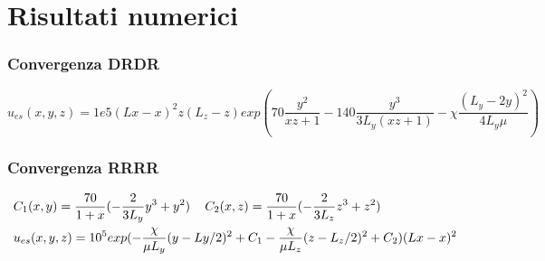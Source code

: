 \section{Risultati numerici}
\begin{frame}
\tableofcontents[currentsection]
\end{frame}

\begin{frame}
\frametitle{Convergenza DRDR}
\begin{alertblock}{}
\vspace{-0.3cm}
{\footnotesize
\begin{equation}
u_{es}(x,y,z)=1e5(Lx - x)^2z(L_z-z)exp\left(70\frac{y^2}{xz + 1} - 140\frac{y^3}{3L_y( x z + 1 )} - \chi\frac{(L_y - 2y)^2}{4L_y\mu }\right)
\end{equation}
}\end{alertblock}

\begin{figure}[!h]
\centering
{}
\label{fig:drdrconv}
\end{figure}
\end{frame}

\begin{frame}
\frametitle{Convergenza RRRR}
\begin{alertblock}{}
\vspace{-0.2cm}
{\footnotesize
\begin{equation}
\begin{split}
& C_1(x,y)=\frac{70}{1+x}(-\frac{2}{3L_y} y^3+ y^2) \psp{7}
C_2(x,z)=\frac{70}{1+x}(-\frac{2}{3L_z}z^3+z^2) \\
& u_{es}(x,y,z)=10^5exp( - \frac{\chi}{\mu L_y} (y - Ly/2 )^2 + C_1  - \frac{\chi}{\mu L_z}(z - L_z/2 ) ^ 2 + C_2 )(Lx-x)^2 
\end{split}
\end{equation}
}\end{alertblock}
\begin{figure}[!h]
\centering
{}
\end{figure}

\end{frame}

